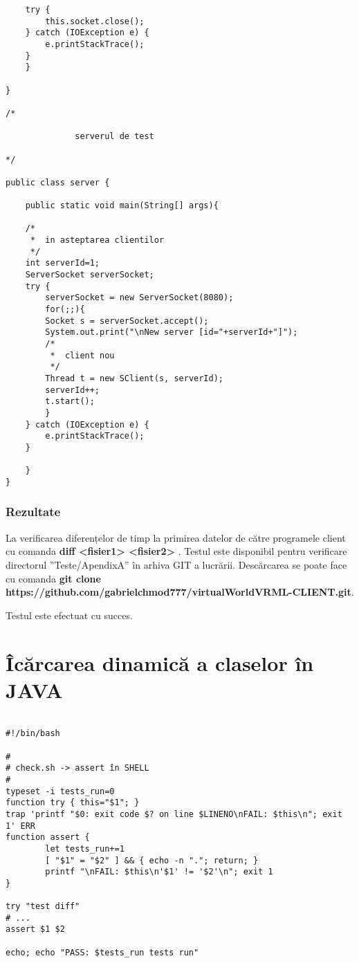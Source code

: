 \begin{lstlisting}
	try {
	    this.socket.close();
	} catch (IOException e) {
	    e.printStackTrace();
	}
    }

}

/*

              serverul de test

*/

public class server {
	
    public static void main(String[] args){
		
	/*
	 *  in asteptarea clientilor
	 */
	int serverId=1;
	ServerSocket serverSocket;
	try {
	    serverSocket = new ServerSocket(8080);
	    for(;;){
		Socket s = serverSocket.accept();
		System.out.print("\nNew server [id="+serverId+"]");
		/*
		 *  client nou
		 */
		Thread t = new SClient(s, serverId);
		serverId++;
		t.start();
	    }
	} catch (IOException e) {
	    e.printStackTrace();
	}

    }
}

\end{lstlisting}


\subsection{Rezultate}
\par La verificarea diferențelor de timp la primirea datelor de către programele client cu comanda \textbf{ diff <fisier1> <fisier2> }. Testul este disponibil pentru verificare directorul ”Teste/ApendixA” în arhiva GIT a lucrării. Descărcarea se poate face cu comanda \textbf{git clone  https://github.com/gabrielchmod777/virtualWorldVRML-CLIENT.git}.

\par Testul este efectuat cu succes.
\newpage
\chapter{Îcărcarea dinamică a claselor în JAVA}

\scriptsize \begin{verbatim}

#!/bin/bash

#
# check.sh -> assert în SHELL
#
typeset -i tests_run=0
function try { this="$1"; }
trap 'printf "$0: exit code $? on line $LINENO\nFAIL: $this\n"; exit 1' ERR
function assert {
        let tests_run+=1
        [ "$1" = "$2" ] && { echo -n "."; return; }
        printf "\nFAIL: $this\n'$1' != '$2'\n"; exit 1
}

try "test diff"
# ...
assert $1 $2

echo; echo "PASS: $tests_run tests run"

\end{verbatim}

